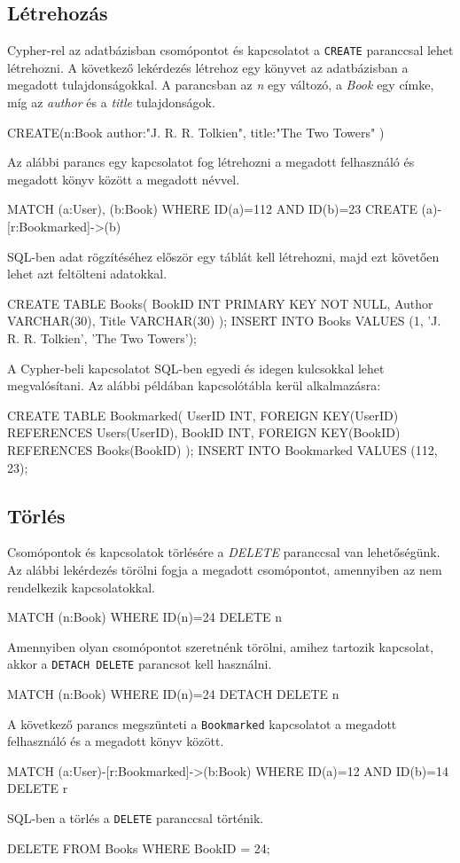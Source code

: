 \subsection{Létrehozás}
Cypher-rel az adatbázisban csomópontot és kapcsolatot a \texttt{CREATE} paranccsal lehet létrehozni. A következő lekérdezés létrehoz egy könyvet az adatbázisban a megadott tulajdonságokkal. A parancsban az \textit{n} egy változó, a \textit{Book} egy címke, míg az \textit{author} és a \textit{title} tulajdonságok. 
\begin{java}[columns=fullflexible]
CREATE(n:Book{
  author:"J. R. R. Tolkien",
  title:"The Two Towers"
})
\end{java}
Az alábbi parancs egy kapcsolatot fog létrehozni a megadott felhasználó és megadott könyv között a megadott névvel.
\begin{java}[columns=fullflexible]
MATCH (a:User), (b:Book) 
WHERE ID(a)=112 AND ID(b)=23
CREATE (a)-[r:Bookmarked]->(b) 
\end{java}
SQL-ben adat rögzítéséhez először egy táblát kell létrehozni, majd ezt követően lehet azt feltölteni adatokkal.
\begin{java}[columns=fullflexible]
CREATE TABLE Books(
  BookID INT PRIMARY KEY NOT NULL,
  Author VARCHAR(30),
  Title VARCHAR(30)
);
INSERT INTO Books
VALUES (1, 'J. R. R. Tolkien', 'The Two Towers');
\end{java}
A Cypher-beli kapcsolatot SQL-ben egyedi és idegen kulcsokkal lehet megvalósítani. Az alábbi példában kapcsolótábla kerül alkalmazásra:
\begin{java}[columns=fullflexible]
CREATE TABLE Bookmarked(
  UserID INT, 
  FOREIGN KEY(UserID) REFERENCES Users(UserID),
  BookID INT, 
  FOREIGN KEY(BookID) REFERENCES Books(BookID)
);
INSERT INTO Bookmarked VALUES (112, 23);
\end{java}

\subsection{Törlés}
Csomópontok és kapcsolatok törlésére a \textit{DELETE} paranccsal van lehetőségünk. Az alábbi lekérdezés törölni fogja a megadott csomópontot, amennyiben az nem rendelkezik kapcsolatokkal.
\begin{java}[columns=fullflexible]
MATCH (n:Book) 
WHERE ID(n)=24 
DELETE n
\end{java}
Amennyiben olyan csomópontot szeretnénk törölni, amihez tartozik kapcsolat, akkor a \texttt{DETACH DELETE} parancsot kell használni.
\begin{java}[columns=fullflexible]
MATCH (n:Book) 
WHERE ID(n)=24
DETACH DELETE n
\end{java}
A következő parancs megszünteti a \texttt{Bookmarked} kapcsolatot a megadott felhasználó és a megadott könyv között.
\begin{java}[columns=fullflexible]
MATCH (a:User)-[r:Bookmarked]->(b:Book) 
WHERE ID(a)=12 AND ID(b)=14
DELETE r
\end{java}
SQL-ben a törlés a \texttt{DELETE} paranccsal történik.
\begin{java}[columns=fullflexible]
DELETE FROM Books 
WHERE BookID = 24;
\end{java}

